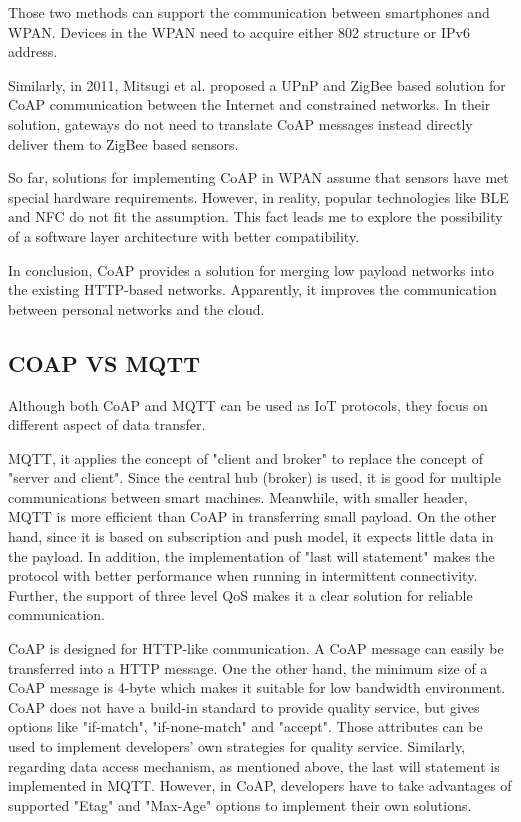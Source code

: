 \documentclass{Nan_Thesis}
\begin{document}
Those two methods can support the communication between smartphones and WPAN. Devices in the WPAN need to acquire either 802 structure or IPv6 address.

Similarly, in 2011, Mitsugi et al. \cite{mitsugi2011bridging} proposed a UPnP and ZigBee based solution for CoAP communication between the Internet and constrained networks. In their solution, gateways do not need to translate CoAP messages instead directly deliver them to ZigBee based sensors.  

So far, solutions for implementing CoAP in WPAN assume that sensors have met special hardware requirements. However, in reality, popular technologies like BLE and NFC do not fit the assumption. This fact leads me to explore the possibility of a software layer architecture with better compatibility.

In conclusion, CoAP provides a solution for merging low payload networks into the existing HTTP-based networks. Apparently, it improves the communication between personal networks and the cloud.  
\subsection{COAP VS MQTT} 
Although both CoAP and MQTT can be used as IoT protocols, they focus on different aspect of data transfer.

MQTT, it applies the concept of "client and broker" to replace the concept of "server and client". Since the central hub (broker) is used, it is good for multiple communications between smart machines. Meanwhile, with smaller header, MQTT is more efficient than CoAP in transferring small payload. On the other hand, since it is based on subscription and push model, it expects little data in the payload. In addition, the implementation of "last will statement" makes the protocol with better performance when running in intermittent connectivity. Further, the support of three level QoS makes it a clear solution for reliable communication.

CoAP is designed for HTTP-like communication. A CoAP message can easily be transferred into a HTTP message. One the other hand, the minimum size of a CoAP message is 4-byte which makes it suitable for low bandwidth environment. CoAP does not have a build-in standard to provide quality service, but gives options like "if-match", "if-none-match" and "accept". Those attributes can be used to implement developers’ own strategies for quality service. Similarly, regarding data access mechanism, as mentioned above, the last will statement is implemented in MQTT. However, in CoAP, developers have to take advantages of supported "Etag" and "Max-Age" options to implement their own solutions.
\end{document}
